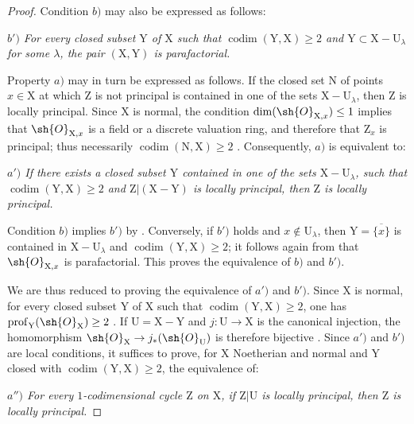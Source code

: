 \begin{proof}
Condition $b)$ may also be expressed as follows:

\emph{$b')$ For every closed subset $\mathrm{Y}$ of $\mathrm{X}$ such that $\operatorname{codim}(\mathrm{Y},\mathrm{X})\geq 2$ and $\mathrm{Y}\subset\mathrm{X}-\mathrm{U}_\lambda$ for some $\lambda$, the pair $(\mathrm{X},\mathrm{Y})$ is parafactorial.}

Property $a)$ may in turn be expressed as follows. If the closed set $\mathrm{N}$ of points $x\in\mathrm{X}$ at which $\mathrm{Z}$ is not principal is contained in one of the sets $\mathrm{X}-\mathrm{U}_\lambda$, then $\mathrm{Z}$ is locally principal. Since $\mathrm{X}$ is normal, the condition $\dim(\sh{O}_{\mathrm{X},x})\leq 1$ implies that $\sh{O}_{\mathrm{X},x}$ is a field or a discrete valuation ring, and therefore that $\mathrm{Z}_x$ is principal; thus necessarily $\operatorname{codim}(\mathrm{N},\mathrm{X})\geq 2$ . Consequently, $a)$ is equivalent to:

\emph{$a')$ If there exists a closed subset $\mathrm{Y}$ contained in one of the sets $\mathrm{X}-\mathrm{U}_\lambda$, such that $\operatorname{codim}(\mathrm{Y},\mathrm{X})\geq 2$ and $\mathrm{Z}|(\mathrm{X}-\mathrm{Y})$ is locally principal, then $\mathrm{Z}$ is locally principal.}

Condition $b)$ implies $b')$ by . Conversely, if $b')$ holds and $x\notin\mathrm{U}_\lambda$, then $\mathrm{Y}=\overline{\{x\}}$ is contained in $\mathrm{X}-\mathrm{U}_\lambda$ and $\operatorname{codim}(\mathrm{Y},\mathrm{X})\geq 2$; it follows again from  that $\sh{O}_{\mathrm{X},x}$ is parafactorial. This proves the equivalence of $b)$ and $b')$.

We are thus reduced to proving the equivalence of $a')$ and $b')$. Since $\mathrm{X}$ is normal, for every closed subset $\mathrm{Y}$ of $\mathrm{X}$ such that $\operatorname{codim}(\mathrm{Y},\mathrm{X})\geq 2$, one has $\operatorname{prof}_{\mathrm{Y}}(\sh{O}_{\mathrm{X}})\geq 2$ . If $\mathrm{U}=\mathrm{X}-\mathrm{Y}$ and $j:\mathrm{U}\to\mathrm{X}$ is the canonical injection, the homomorphism $\sh{O}_{\mathrm{X}}\to j_*(\sh{O}_{\mathrm{U}})$ is therefore bijective . Since $a')$ and $b')$ are local conditions, it suffices to prove, for $\mathrm{X}$ Noetherian and normal and $\mathrm{Y}$ closed with $\operatorname{codim}(\mathrm{Y},\mathrm{X})\geq 2$, the equivalence of:

\emph{$a'')$ For every $1$-codimensional cycle $\mathrm{Z}$ on $\mathrm{X}$, if $\mathrm{Z}|\mathrm{U}$ is locally principal, then $\mathrm{Z}$ is locally principal.}


\end{proof}
